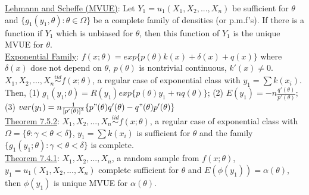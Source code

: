 \documentclass[10pt,landscape]{article}
\begin{document}
\begin{multicols}{3}
\begin{description}
		\underline{Lehmann and Scheffe (MVUE)}: Let $Y_1 = u_1(X_1,X_2, ..., X_n)$ be sufficient for $\theta$ and $\{g_1(y_1, \theta): \theta	\in \Omega \}$ be a complete family of densities (or p.m.f's). If there is a function if $Y_1$ which is unbiased for $\theta	$, then this function of $Y_1$ is the unique MVUE for $\theta$. \\
		\underline{Exponential Family}: $f(x; \theta) = exp\{p(\theta)k(x) + \delta (x) + q(x)\}$ where $\delta(x)$ dose not depend on $\theta$, $p(\theta)$ is nontrivial continuous, $k'(x) \neq 0$.\\
		$X_1,X_2, ..., X_n \overset{iid}{\sim} f(x; \theta)$, a regular case of exponential class with $y_1 = \sum k(x_i)$. Then, (1) $g_1(y_1; \theta) = R(y_1)exp\{p(\theta)y_1 + nq(\theta)\}$; (2) $E(y_1) = -n\frac{q'(\theta)}{p'(\theta)}$; (3) $var(y_1) = n\frac{1}{[p'(\theta)]^3}\{p"(\theta)q'(\theta) - q"(\theta)p'(\theta)\}$ \\
		\underline{Theorem 7.5.2}: $X_1,X_2, ..., X_n \overset{iid}{\sim} f(x; \theta)$, a regular case of exponential class with $\Omega = \{\theta: \gamma < \theta < \delta \}$, $y_1 = \sum	k(x_i)$ is sufficient for $\theta$ and the family $\{g_1(y_1; \theta): \gamma < \theta< \delta \}$ is complete. \\
		\underline{Theorem 7.4.1}: $X_1, X_2, ..., X_n$, a random sample from $f(x;\theta)$, $y_1 = u_1(X_1, X_2, ..., X_n)$ complete sufficient for $\theta$ and  $E(\phi(y_1)) = \alpha(\theta)$, then $\phi(y_1)$ is unique MVUE for $\alpha(\theta)$.\\
		 
	\end{description}	  
	

\end{multicols}
\end{document}
